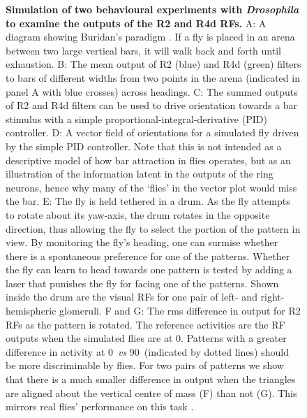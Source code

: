 \begin{figure}[htp]
	\caption{
		{\bf Simulation of two behavioural experiments with \emph{Drosophila} to examine the outputs of the R2 and R4d \acp{RF}.}
		A: A diagram showing Buridan's paradigm \protect\cite{Gotz1980,Bulthoff1982}. If a fly is placed in an arena between two large vertical bars, it will walk back and forth until exhaustion.
		B: The mean output of R2 (blue) and R4d (green) filters to bars of different widths from two points in the arena (indicated in panel A with blue crosses) across headings.
		C: The summed outputs of R2 and R4d filters can be used to drive orientation towards a bar stimulus with a simple
		proportional-integral-derivative (PID) controller.
		D: A vector field of orientations for a simulated fly driven by the simple PID controller.
		Note that this is not intended as a descriptive model of how bar attraction in flies operates, but as an illustration of the information latent in the outputs of the ring neurons, hence why many of the `flies' in the vector plot would miss the bar.
		E: The fly is held tethered in a drum. As the fly attempts to rotate about its yaw-axis, the drum rotates in the opposite direction, thus allowing the fly to select the portion of the pattern in view.
		By monitoring the fly's heading, one can surmise whether there is a spontaneous preference for one of the patterns.
		Whether the fly can learn to head towards one pattern is tested by adding a laser that punishes the fly for facing one of the patterns.
		Shown inside the drum are the visual \acp{RF} for one pair of left- and right-hemispheric glomeruli.
		F and G: The \ac{rms} difference in output for R2 \acp{RF} as the pattern is rotated.
		The reference activities are the \ac{RF} outputs when the simulated flies are at 0\degree.
		Patterns with a greater difference in activity at 0\degree\ \emph{vs} 90\degree\ (indicated by dotted lines) should be more discriminable by flies.
		For two pairs of patterns we show that there is a much smaller difference in output when the triangles are aligned about the vertical centre of mass (F) than not (G).
		This mirrors real flies' performance on this task \cite{Ernst1999}.
	}
	\label{fig:recap}
\end{figure}

